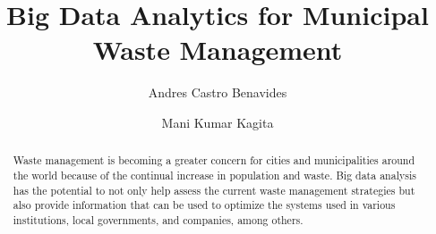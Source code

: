 
\def\paperstatus{100} %
\def\paperchapter{Government} %
\def\hid{hid-sp18-709, hid-sp18-711} %
\def\volume{10} %

\def\locator{%
\hid, Volume: \volume, Chapter: \paperchapter, Status: \paperstatus. \newline}

\title{Big Data Analytics for Municipal Waste Management}

\author{Andres Castro Benavides}

\author{Mani Kumar Kagita}
\renewcommand{\shortauthors}{A. Castro, M. K. Kagita}

\begin{abstract}
Waste management is becoming a greater concern for cities and municipalities 
around the world because of the continual increase in population and waste. 
Big data analysis has the potential to not only help assess the current 
waste management strategies but also provide information that can be used 
to optimize the systems used in various institutions, local governments, 
and companies, among others.
\end{abstract}


\maketitle

